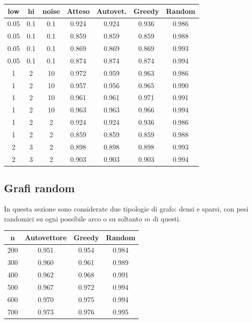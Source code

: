 \documentclass{article}
\begin{document}
\begin{center}
    \begin{tabular}{|c|c|c|c|c|c|c|}
        \hline
        low & hi & noise & Atteso & Autovet. & Greedy & Random \\
        \hline
        \hline
        0.05 & 0.1 & 0.1 & 0.924 & 0.924 & 0.936 & 0.986 \\
        0.05 & 0.1 & 0.1 & 0.859 & 0.859 & 0.859 & 0.988 \\
        0.05 & 0.1 & 0.1 & 0.869 & 0.869 & 0.869 & 0.993 \\
        0.05 & 0.1 & 0.1 & 0.874 & 0.874 & 0.874 & 0.994 \\
        \hline
        \hline
        1 & 2 & 10 & 0.972 & 0.959 & 0.963 & 0.986 \\
        1 & 2 & 10 & 0.957 & 0.956 & 0.965 & 0.990 \\
        1 & 2 & 10 & 0.961 & 0.961 & 0.971 & 0.991 \\
        1 & 2 & 10 & 0.963 & 0.963 & 0.966 & 0.994 \\
        \hline
        \hline
        1 & 2 & 2 & 0.924 & 0.924 & 0.936 & 0.986 \\
        1 & 2 & 2 & 0.859 & 0.859 & 0.859 & 0.988 \\
        2 & 3 & 2 & 0.898 & 0.898 & 0.898 & 0.993 \\
        2 & 3 & 2 & 0.903 & 0.903 & 0.903 & 0.994 \\
        \hline
    \end{tabular}
\end{center}

\pagebreak

\subsection{Grafi random}

In questa sezione sono considerate due tipologie di grafo: densi e sparsi,
con pesi randomici su ogni possibile arco o su soltanto $m$ di questi.

\begin{center}
    \begin{tabular}{|c|c|c|c|}
        \hline
        n & Autovettore & Greedy & Random \\
        \hline
        \hline
        200 & 0.951 & 0.954 & 0.984 \\
        300 & 0.960 & 0.961 & 0.989 \\
        400 & 0.962 & 0.968 & 0.991 \\
        500 & 0.967 & 0.972 & 0.994 \\
        600 & 0.970 & 0.975 & 0.994 \\
        700 & 0.973 & 0.976 & 0.995 \\
        \hline
    \end{tabular}
\end{center}
\end{document}
